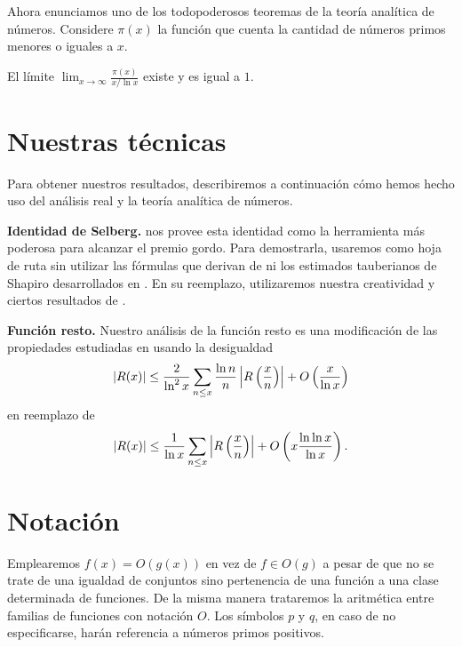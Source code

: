 Ahora enunciamos uno de los todopoderosos teoremas
de la teor\'ia anal\'itica de n\'umeros.
Considere \(\pi(x)\) la funci\'on que cuenta
la cantidad de n\'umeros primos menores o iguales a \(x\).

\begin{theorem}
  El l\'imite
  \(\displaystyle\lim_{x \to \infty} \frac{\pi(x)}{x / \ln x}\)
  existe y es igual a \(1\).
\end{theorem}

\section{Nuestras t\'ecnicas}
Para obtener nuestros resultados,
describiremos a continuaci\'on
c\'omo hemos hecho uso del an\'alisis real y
la teor\'ia anal\'itica de n\'umeros.

\textbf{Identidad de Selberg.}
\cite[secci\'on 2]{Selberg1949} nos provee esta identidad como
la herramienta m\'as poderosa para alcanzar el premio gordo.
Para demostrarla, usaremos como hoja de ruta \cite{Choudhary2017}
sin utilizar las f\'ormulas que derivan de \cite[teorema 3.17]{Choudhary2017}
ni los estimados tauberianos de Shapiro desarrollados en \cite[secci\'on 4]{Choudhary2017}.
En su reemplazo, utilizaremos nuestra creatividad y
ciertos resultados de \cite{Apostol1976, Diamond1982, TI1951}.

\textbf{Funci\'on resto.}
Nuestro an\'alisis de la funci\'on resto es una modificaci\'on de
las propiedades estudiadas en \cite[secci\'on 3]{Selberg1949} usando la desigualdad
\[
  \left\lvert R(x) \right\rvert \leq \frac{2}{\ln^2 x}
  \sum_{n \leq x} \frac{\ln n}{n} \left\lvert R \left( \frac{x}{n} \right) \right\rvert
  + O\left( \frac{x}{\ln x} \right)
\]
en reemplazo de
\[
  \left\lvert R(x) \right\rvert \leq \frac{1}{\ln x}
  \sum_{n \leq x} \left\lvert R \left( \frac{x}{n} \right) \right\rvert
  + O\left( x \frac{\ln \ln x}{\ln x} \right).
\]

\section{Notaci\'on}
Emplearemos \(f(x) = O(g(x))\) en vez de \(f \in O(g)\)
a pesar de que no se trate de una igualdad de conjuntos sino
pertenencia de una funci\'on a una clase determinada de funciones.
De la misma manera trataremos la aritm\'etica entre familias de funciones
con notaci\'on \(O\).
Los s\'imbolos \(p\) y \(q\), en caso de no especificarse,
har\'an referencia a n\'umeros primos positivos.

